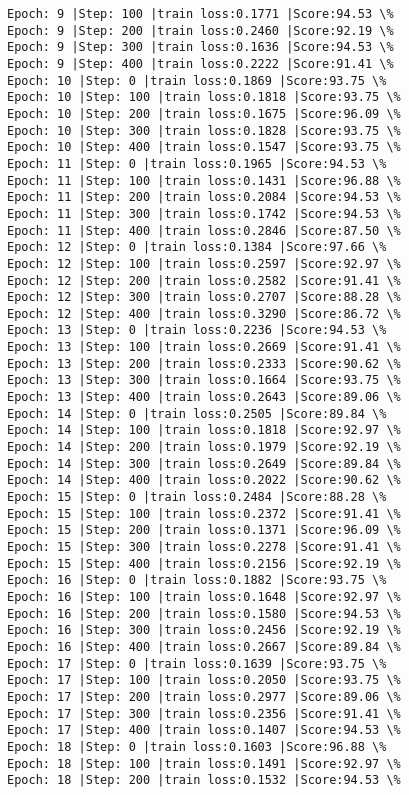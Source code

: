 \documentclass[11pt]{article}
\begin{document}
\begin{Verbatim}[commandchars=\\\{\}]
Epoch: 9 |Step: 100 |train loss:0.1771 |Score:94.53 \%
Epoch: 9 |Step: 200 |train loss:0.2460 |Score:92.19 \%
Epoch: 9 |Step: 300 |train loss:0.1636 |Score:94.53 \%
Epoch: 9 |Step: 400 |train loss:0.2222 |Score:91.41 \%
Epoch: 10 |Step: 0 |train loss:0.1869 |Score:93.75 \%
Epoch: 10 |Step: 100 |train loss:0.1818 |Score:93.75 \%
Epoch: 10 |Step: 200 |train loss:0.1675 |Score:96.09 \%
Epoch: 10 |Step: 300 |train loss:0.1828 |Score:93.75 \%
Epoch: 10 |Step: 400 |train loss:0.1547 |Score:93.75 \%
Epoch: 11 |Step: 0 |train loss:0.1965 |Score:94.53 \%
Epoch: 11 |Step: 100 |train loss:0.1431 |Score:96.88 \%
Epoch: 11 |Step: 200 |train loss:0.2084 |Score:94.53 \%
Epoch: 11 |Step: 300 |train loss:0.1742 |Score:94.53 \%
Epoch: 11 |Step: 400 |train loss:0.2846 |Score:87.50 \%
Epoch: 12 |Step: 0 |train loss:0.1384 |Score:97.66 \%
Epoch: 12 |Step: 100 |train loss:0.2597 |Score:92.97 \%
Epoch: 12 |Step: 200 |train loss:0.2582 |Score:91.41 \%
Epoch: 12 |Step: 300 |train loss:0.2707 |Score:88.28 \%
Epoch: 12 |Step: 400 |train loss:0.3290 |Score:86.72 \%
Epoch: 13 |Step: 0 |train loss:0.2236 |Score:94.53 \%
Epoch: 13 |Step: 100 |train loss:0.2669 |Score:91.41 \%
Epoch: 13 |Step: 200 |train loss:0.2333 |Score:90.62 \%
Epoch: 13 |Step: 300 |train loss:0.1664 |Score:93.75 \%
Epoch: 13 |Step: 400 |train loss:0.2643 |Score:89.06 \%
Epoch: 14 |Step: 0 |train loss:0.2505 |Score:89.84 \%
Epoch: 14 |Step: 100 |train loss:0.1818 |Score:92.97 \%
Epoch: 14 |Step: 200 |train loss:0.1979 |Score:92.19 \%
Epoch: 14 |Step: 300 |train loss:0.2649 |Score:89.84 \%
Epoch: 14 |Step: 400 |train loss:0.2022 |Score:90.62 \%
Epoch: 15 |Step: 0 |train loss:0.2484 |Score:88.28 \%
Epoch: 15 |Step: 100 |train loss:0.2372 |Score:91.41 \%
Epoch: 15 |Step: 200 |train loss:0.1371 |Score:96.09 \%
Epoch: 15 |Step: 300 |train loss:0.2278 |Score:91.41 \%
Epoch: 15 |Step: 400 |train loss:0.2156 |Score:92.19 \%
Epoch: 16 |Step: 0 |train loss:0.1882 |Score:93.75 \%
Epoch: 16 |Step: 100 |train loss:0.1648 |Score:92.97 \%
Epoch: 16 |Step: 200 |train loss:0.1580 |Score:94.53 \%
Epoch: 16 |Step: 300 |train loss:0.2456 |Score:92.19 \%
Epoch: 16 |Step: 400 |train loss:0.2667 |Score:89.84 \%
Epoch: 17 |Step: 0 |train loss:0.1639 |Score:93.75 \%
Epoch: 17 |Step: 100 |train loss:0.2050 |Score:93.75 \%
Epoch: 17 |Step: 200 |train loss:0.2977 |Score:89.06 \%
Epoch: 17 |Step: 300 |train loss:0.2356 |Score:91.41 \%
Epoch: 17 |Step: 400 |train loss:0.1407 |Score:94.53 \%
Epoch: 18 |Step: 0 |train loss:0.1603 |Score:96.88 \%
Epoch: 18 |Step: 100 |train loss:0.1491 |Score:92.97 \%
Epoch: 18 |Step: 200 |train loss:0.1532 |Score:94.53 \%

\end{Verbatim}
\end{document}
